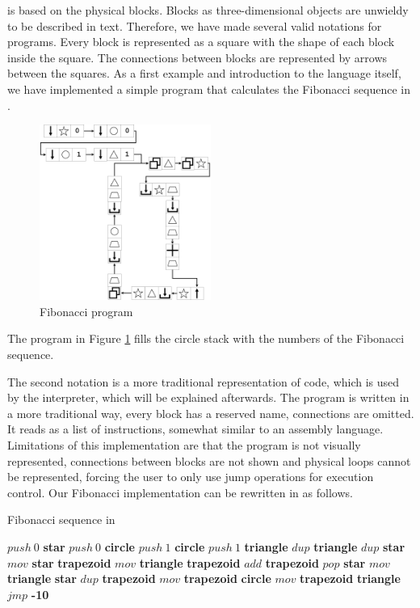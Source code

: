\sculpt is based on the physical blocks. Blocks as three-dimensional objects are unwieldy to be described in text.
Therefore, we have made several valid notations for \sculpt programs.
Every block is represented as a square with the shape of each block inside the square.
The connections between blocks are represented by arrows between the squares.
As a first example and introduction to the language itself, we have implemented a simple program that calculates the Fibonacci sequence in \sculpt.

\begin{figure}[h]
    \centering
    \includegraphics[width=0.5\textwidth]{figures/ArtlangFibpng}
    \caption{\sculpt Fibonacci program}
    \label{fig:artlangfib}
    \vspace{5pt}
\end{figure}

The program in Figure \ref{fig:artlangfib} fills the circle stack with the numbers of the Fibonacci sequence.

The second notation is a more traditional representation of code, which is used by the \sculpter interpreter, which will be explained afterwards.
The program is written in a more traditional way, every block has a reserved name, connections are omitted. It reads as a list of instructions, somewhat similar to an assembly language.
Limitations of this implementation are that the program is not visually represented, connections between blocks are not shown and physical loops cannot be represented, forcing the user to only use jump operations for execution control.
Our Fibonacci implementation can be rewritten in \sculpter as follows.

\begin{algorithm}
    \caption{Fibonacci sequence in \sculpt}
    \label{alg:fib}
    \small
    \begin{algorithmic}
    \State $push~0$ \textbf{star}
    \State $push~0$ \textbf{circle}
    \State $push~1$ \textbf{circle}
    \State $push~1$ \textbf{triangle}
    \State $dup$ \textbf{triangle}
    \State $dup$ \textbf{star}
    \State $mov$ \textbf{star} \textbf{trapezoid}
    \State $mov$ \textbf{triangle} \textbf{trapezoid}
    \State $add$ \textbf{trapezoid}
    \State $pop$ \textbf{star}
    \State $mov$ \textbf{triangle} \textbf{star}
    \State $dup$ \textbf{trapezoid}
    \State $mov$ \textbf{trapezoid} \textbf{circle}
    \State $mov$ \textbf{trapezoid} \textbf{triangle}
    \State $jmp$ \textbf{-10}
    \end{algorithmic}
    \end{algorithm}


